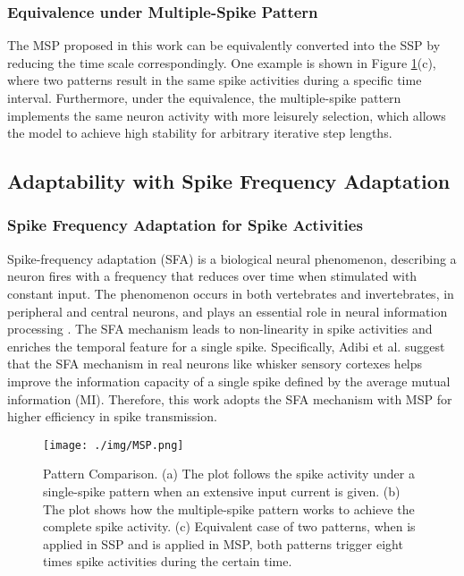 \documentclass{article}
\begin{document}
\subsubsection{Equivalence under Multiple-Spike Pattern}
The MSP proposed in this work can be equivalently converted into the SSP by reducing the time scale correspondingly. One example is shown in Figure \ref{fig:Pattern Comparison}(c), where two patterns result in the same spike activities during a specific time interval. Furthermore, under the equivalence, the multiple-spike pattern implements the same neuron activity with more leisurely  selection, which allows the model to achieve high stability for arbitrary iterative step lengths. 





\subsection{Adaptability with Spike Frequency Adaptation}

\subsubsection{Spike Frequency Adaptation for Spike Activities}



Spike-frequency adaptation (SFA) is a biological neural phenomenon, describing a neuron fires with a frequency that reduces over time when stimulated with constant input.
The phenomenon occurs in both vertebrates and invertebrates, in peripheral and central neurons, and plays an essential role in neural information processing \cite{benda_universal_2003}. The SFA mechanism leads to non-linearity in spike activities and enriches the temporal feature for a single spike. 
Specifically, Adibi et al.  suggest that the SFA mechanism in real neurons like whisker sensory cortexes helps improve the information capacity of a single spike defined by the average mutual information (MI).
Therefore, this work adopts the SFA mechanism with MSP for higher efficiency in spike transmission.

\begin{figure}[htbp]
    \centering
    \texttt{[image: ./img/MSP.png]}
    \caption{Pattern Comparison. (a) The plot follows the spike activity under a single-spike pattern when an extensive input current  is given. (b) The plot shows how the multiple-spike pattern works to achieve the complete spike activity. (c) Equivalent case of two patterns, when  is applied in SSP and  is applied in MSP, both patterns trigger eight times spike activities during the certain time.}
    \label{fig:Pattern Comparison}
\end{figure}
\end{document}
